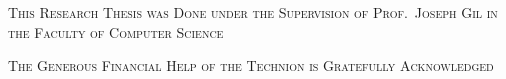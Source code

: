 \begin{center}
\textsc{This Research Thesis was Done under the Supervision of Prof.\ Joseph Gil in the Faculty of Computer Science}
\end{center}
\vspace{4ex}
%
%
%

\vfill
\begin{center}
\textsc{The Generous Financial Help of the Technion is Gratefully Acknowledged}
\end{center}


